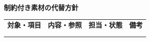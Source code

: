 \documentclass[11pt,a4paper]{article}
\begin{document}
\par{}\noindent\textbf{制約付き素材の代替方針}\par\vspace{1mm}
{\fontsize{8.5}{13}\selectfont
\begin{tabularx}{\linewidth}{@{}XXXX@{}}
\textbf{対象・項目} & \textbf{内容・参照} & \textbf{担当・状態} & \textbf{備考}\\[2mm]
\strut & \strut & \strut & \strut\\[5mm]
\strut & \strut & \strut & \strut\\[5mm]
\end{tabularx}
}\vspace{2mm}\par
\end{document}
